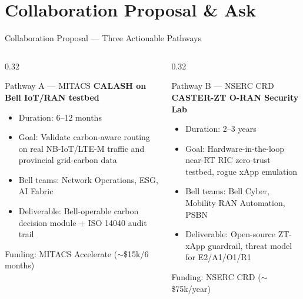 \documentclass[aspectratio=169, 11pt]{beamer}
\begin{document}
\section{Collaboration Proposal \& Ask}

\begin{frame}{Collaboration Proposal — Three Actionable Pathways}

\begin{columns}[T]

\begin{column}{0.32\textwidth}
  \begin{block}{Pathway A — MITACS}
    \vspace{2pt}
    \textbf{CALASH on Bell IoT/RAN testbed}\\[4pt]
    \begin{itemize}\setlength{\itemsep}{2pt}
      \item[\textbullet] Duration: 6–12 months
      \item[\textbullet] Goal: Validate carbon-aware routing on real NB-IoT/LTE-M traffic and provincial grid-carbon data
      \item[\textbullet] Bell teams: Network Operations, ESG, AI Fabric
      \item[\textbullet] Deliverable: Bell-operable carbon decision module + ISO 14040 audit trail
    \end{itemize}
    \vspace{2pt}
    {\scriptsize Funding: MITACS Accelerate ($\sim$\$15k/6 months)}
  \end{block}
\end{column}

\begin{column}{0.32\textwidth}
  \begin{alertblock}{Pathway B — NSERC CRD}
    \vspace{2pt}
    \textbf{CASTER-ZT O-RAN Security Lab}\\[4pt]
    \begin{itemize}\setlength{\itemsep}{2pt}
      \item[\textbullet] Duration: 2–3 years
      \item[\textbullet] Goal: Hardware-in-the-loop near-RT RIC zero-trust testbed, rogue xApp emulation
      \item[\textbullet] Bell teams: Bell Cyber, Mobility RAN Automation, PSBN
      \item[\textbullet] Deliverable: Open-source ZT-xApp guardrail, threat model for E2/A1/O1/R1
    \end{itemize}
    \vspace{2pt}
    {\scriptsize Funding: NSERC CRD ($\sim$\$75k/year)}
  \end{alertblock}
\end{column}


\end{columns}
\end{frame}
\end{document}
